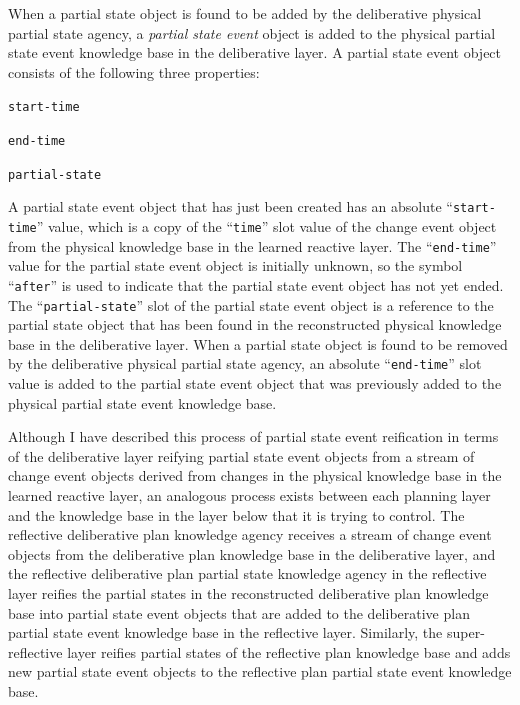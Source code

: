 When a partial state object is found to be added by the deliberative
physical partial state agency, a {\emph{partial state event}} object
is added to the physical partial state event knowledge base in the
deliberative layer.  A partial state event object consists of the
following three properties:
\begin{packed_enumerate}
\item{{\tt{start-time}}}
\item{{\tt{end-time}}}
\item{{\tt{partial-state}}}
\end{packed_enumerate}
A partial state event object that has just been created has an
absolute ``{\tt{start-time}}'' value, which is a copy of the
``{\tt{time}}'' slot value of the change event object from the
physical knowledge base in the learned reactive layer.  The
``{\tt{end-time}}'' value for the partial state event object is
initially unknown, so the symbol ``{\tt{after}}'' is used to indicate
that the partial state event object has not yet ended.  The
``{\tt{partial-state}}'' slot of the partial state event object is a
reference to the partial state object that has been found in the
reconstructed physical knowledge base in the deliberative layer.  When
a partial state object is found to be removed by the deliberative
physical partial state agency, an absolute ``{\tt{end-time}}'' slot
value is added to the partial state event object that was previously
added to the physical partial state event knowledge base.

Although I have described this process of partial state event
reification in terms of the deliberative layer reifying partial state
event objects from a stream of change event objects derived from
changes in the physical knowledge base in the learned reactive layer,
an analogous process exists between each planning layer and the
knowledge base in the layer below that it is trying to control.  The
reflective deliberative plan knowledge agency receives a stream of
change event objects from the deliberative plan knowledge base in the
deliberative layer, and the reflective deliberative plan partial state
knowledge agency in the reflective layer reifies the partial states in
the reconstructed deliberative plan knowledge base into partial state
event objects that are added to the deliberative plan partial state
event knowledge base in the reflective layer.  Similarly, the
super-reflective layer reifies partial states of the reflective plan
knowledge base and adds new partial state event objects to the
reflective plan partial state event knowledge base.

